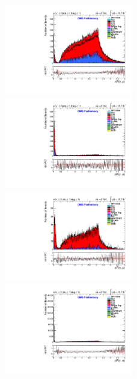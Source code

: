 \documentclass[oneside, a4paper, 11pt, ]{report}
\begin{document}
\begin{figure}
\includegraphics[width=0.5\textwidth]{Plots/ControlPlots/TTbarDiLeptonAnalysis/MuMu/Photons/AllPhotons/Photon_deltaR_muons_splitTTbar_ratio.pdf}
\includegraphics[width=0.5\textwidth]{Plots/ControlPlots/TTbarDiLeptonAnalysis/MuMu/Photons/AllPhotons/Photon_deltaR_electrons_splitTTbar_ratio.pdf}\\
\includegraphics[width=0.5\textwidth]{Plots/ControlPlots/TTbarDiLeptonAnalysis/EE/Photons/AllPhotons/Photon_deltaR_muons_splitTTbar_ratio.pdf}
\includegraphics[width=0.5\textwidth]{Plots/ControlPlots/TTbarDiLeptonAnalysis/EE/Photons/AllPhotons/Photon_deltaR_electrons_splitTTbar_ratio.pdf}\\

\end{figure}
\end{document}
